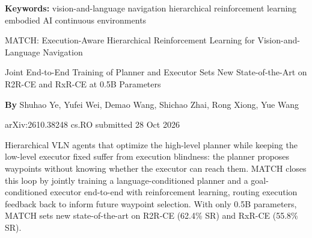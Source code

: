 \documentclass[10pt,twocolumn]{article}
\begin{document}
\setlength{\parindent}{0pt}
\setlength{\parskip}{4pt}

{\small\color{keywordgray}\textbf{Keywords:}
  vision-and-language navigation \textbullet{}
  hierarchical reinforcement learning \textbullet{}
  embodied AI \textbullet{}
  continuous environments}\par\vspace{4pt}

{\LARGE\bfseries\raggedright
  MATCH: Execution-Aware Hierarchical Reinforcement Learning
  for Vision-and-Language Navigation}\par\vspace{4pt}

{\large\itshape\raggedright
  Joint End-to-End Training of Planner and Executor Sets
  New State-of-the-Art on R2R-CE and RxR-CE at 0.5B Parameters}\par\vspace{6pt}

{\small\textbf{By} Shuhao Ye, Yufei Wei, Demao Wang,
  Shichao Zhai, Rong Xiong, Yue Wang}\par\vspace{2pt}

{\small\color{keywordgray}arXiv:2610.38248 \textbullet{} cs.RO
  \textbullet{} submitted 28 Oct 2026}
\par\vspace{2pt}\noindent{\color{rulered}\rule{\columnwidth}{0.6pt}}\vspace{6pt}

Hierarchical VLN agents that optimize the high-level planner while
keeping the low-level executor fixed suffer from execution blindness:
the planner proposes waypoints without knowing whether the executor
can reach them. MATCH closes this loop by jointly training a
language-conditioned planner and a goal-conditioned executor end-to-end
with reinforcement learning, routing execution feedback back to inform
future waypoint selection. With only 0.5B parameters, MATCH sets
new state-of-the-art on R2R-CE (62.4\% SR) and RxR-CE (55.8\% SR).
\end{document}
